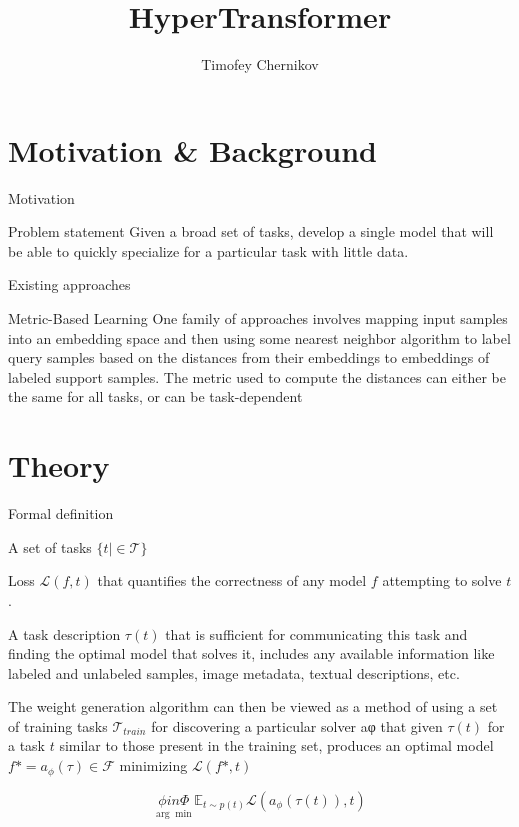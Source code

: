 \documentclass{beamer}
\title{HyperTransformer}
\author{Timofey Chernikov}
\institute{MIPT, 2023}
\begin{document}
\begin{frame}
    \titlepage
\end{frame}




\section{Motivation \& Background}
\begin{frame}{Motivation}
    \begin{block}{Problem statement}
        Given a broad set of tasks, develop a single model that will be able to quickly specialize for a particular task with little data.
    \end{block} 
\end{frame}


\begin{frame}{Existing approaches}
 \begin{block}{Metric-Based Learning}
    One family of approaches involves mapping input samples into an embedding space and
    then using some nearest neighbor algorithm to label query
    samples based on the distances from their embeddings to
    embeddings of labeled support samples. The metric used to
    compute the distances can either be the same for all tasks, or
    can be task-dependent
    \end{block}
\end{frame}

\section{Theory}
\begin{frame}{Formal definition}
    \begin{block}{}
        A set of tasks $\{t| \in \mathcal{T}\}$
        
        Loss $\mathcal{L}(f,t)$ that quantifies the correctness of any
        model $f$ attempting to solve $t$.

        A task description $\tau(t)$ that is sufficient for communicating this task and finding
        the optimal model that solves it,
        includes any available information like labeled and
        unlabeled samples, image metadata, textual descriptions, etc.

        The weight generation algorithm can then be viewed as a
        method of using a set of training tasks $\mathcal{T}_{train}$ for discovering
        a particular solver aφ that given $\tau(t)$ for a task $t$ similar to
        those present in the training set, produces an optimal model
        $f* = a_\phi(\tau) \in \mathcal{F}$ minimizing $\mathcal{L}(f*, t)$

        $$ \underset{\arg \min}{\phi in \Phi} \mathbb{E}_{t \sim p(t)} \mathcal{L}(a_\phi(\tau(t)), t) $$

    \end{block}
\end{frame}
\end{document}
